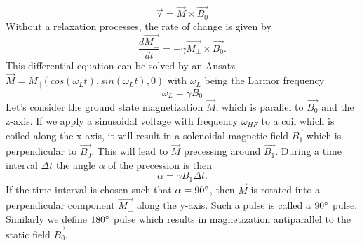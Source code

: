 \begin{equation}
	\label{6}
	\vec{\tau} = \vec{M} \times \vec{B_{0}}
\end{equation}
Without a relaxation processes, the rate of change is given by
\begin{equation}
	\label{7}
	\dfrac{d\vec{M_{\perp}}}{dt} = - \gamma \vec{M_{\perp}} \times \vec{B_{0}}.
\end{equation}
This differential equation can be solved by an Ansatz $\vec{M} = M_{\parallel}(cos(\omega_{L} t),sin(\omega_{L} t),0)$ with $\omega_{L}$ being the Larmor frequency 
\begin{equation}
	\label{8}
	\omega_{L} = \gamma B_{0}
\end{equation}
Let's consider the ground state magnetization $\vec{M}$, which is parallel to $\vec{B_0}$ and the z-axis. If we apply a sinusoidal voltage with frequency $\omega_{HF}$ to a coil which is coiled along the x-axis, it will result in a solenoidal magnetic field $\vec{B_1}$ which is perpendicular to $\vec{B_0}$. This will lead to $\vec{M}$ precessing around $\vec{B_1}$. During a time interval $\Delta t$ the angle $\alpha$ of the precession is then 
\begin{equation}
	\label{9}
	\alpha = \gamma B_{1} \Delta t.
\end{equation}
If the time interval is chosen such that $\alpha = 90 \degree$, then $\vec{M}$ is rotated into a perpendicular component $\vec{M_{\perp}}$ along the y-axis. Such a pulse is called a $90 \degree$ pulse. Similarly we define $180 \degree$ pulse which results in magnetization antiparallel to the static field $\vec{B_{0}}$.
